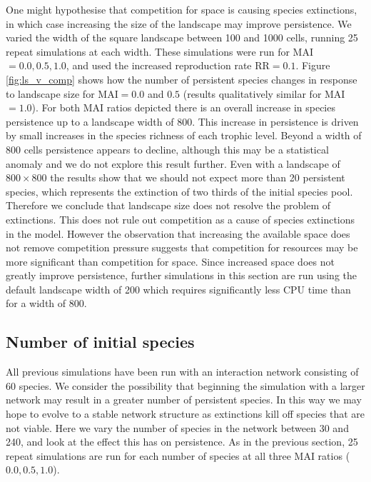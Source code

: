 One might hypothesise that competition for space is causing species extinctions, in which case increasing the size of the landscape may improve persistence. We varied the width of the square landscape between 100 and 1000 cells, running 25 repeat simulations at each width. These simulations were run for MAI$=0.0,0.5,1.0$, and used the increased reproduction rate RR$=0.1$. Figure \ref{fig:ls_v_comp} shows how the number of persistent species changes in response to landscape size for MAI$=0.0$ and $0.5$ (results qualitatively similar for MAI$=1.0$). For both MAI ratios depicted there is an overall increase in species persistence up to a landscape width of 800. This increase in persistence is driven by small increases in the species richness of each trophic level. Beyond a width of 800 cells persistence appears to decline, although this may be a statistical anomaly and we do not explore this result further. Even with a landscape of $800 \times 800$ the results show that we should not expect more than 20 persistent species, which represents the extinction of two thirds of the initial species pool. Therefore we conclude that landscape size does not resolve the problem of extinctions. This does not rule out competition as a cause of species extinctions in the model. However the observation that increasing the available space does not remove competition pressure suggests that competition for resources may be more significant than competition for space. Since increased space does not greatly improve persistence, further simulations in this section are run using the default landscape width of 200 which requires significantly less CPU time than for a width of 800.

\newpage
\subsection{Number of initial species}
\label{sec:numsp_vp}

All previous simulations have been run with an interaction network consisting of 60 species. We consider the possibility that beginning the simulation with a larger network may result in a greater number of persistent species. In this way we may hope to evolve to a stable network structure as extinctions kill off species that are not viable. Here we vary the number of species in the network between 30 and 240, and look at the effect this has on persistence. As in the previous section, 25 repeat simulations are run for each number of species at all three MAI ratios ($0.0,0.5,1.0$).
 
